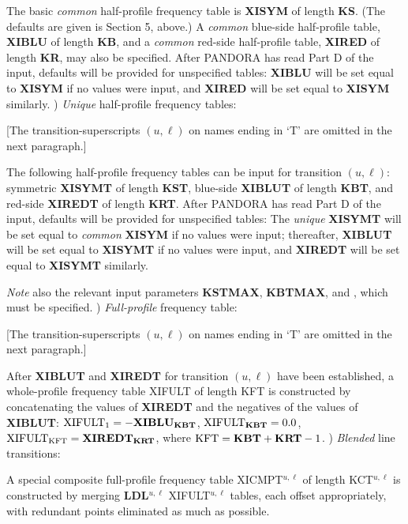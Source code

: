 The basic {\it common} half-profile frequency table is {\bf XISYM} of length {\bf KS}.
(The defaults are given is Section 5, above.)
A {\it common} blue-side half-profile table, {\bf XIBLU} of length {\bf KB},
and a {\it common} red-side half-profile table, {\bf XIRED} of length {\bf KR},
may also be specified. After PANDORA has read Part D of the input,
defaults will be provided for unspecified tables: {\bf XIBLU} will be set
equal to {\bf XISYM} if no values were input, and {\bf XIRED} will be set
equal to {\bf XISYM} similarly.
\blankline
{}) {\it Unique} half-profile frequency tables:

[The transition-superscripts $(u,\ell)$ on names ending in `T'
are omitted in the next paragraph.]

The following half-profile frequency tables can be input for transition $(u,\ell)$:
symmetric {\bf XISYMT} of length {\bf KST},
blue-side {\bf XIBLUT} of length {\bf KBT}, and
red-side {\bf XIREDT} of length {\bf KRT}. After PANDORA has read Part D
of the input, defaults will be provided for unspecified tables:
The {\it unique} {\bf XISYMT} will be set equal to {\it common}
{\bf XISYM} if no values were input; thereafter, {\bf XIBLUT} will
be set equal to {\bf XISYMT} if no values were input, and {\bf XIREDT}
will be set equal to {\bf XISYMT} similarly.

{\it Note} also the relevant input parameters {\bf KSTMAX},
{\bf KBTMAX}, and , which must be specified.
\blankline
{}) {\it Full-profile} frequency table:

[The transition-superscripts $(u,\ell)$ on names ending in `T'
are omitted in the next paragraph.]

After {\bf XIBLUT} and {\bf XIREDT} for transition $(u,\ell)$ have been
established, a whole-profile frequency table XIFULT of length KFT
is constructed by concatenating the values of {\bf XIREDT} and the negatives
of the values of {\bf XIBLUT}:
${\rm XIFULT}_1 = - {\bf XIBLU}_{\bf KBT}$, ${\rm XIFULT}_{\bf KBT} = 0.0$,
${\rm XIFULT}_{\rm KFT} = {\bf XIREDT}_{\bf KRT}$,
where ${\rm KFT} = {\bf KBT} + {\bf KRT} - 1$.
\ej
{}) {\it Blended} line transitions:

A special composite full-profile frequency table XICMPT$^{u,\ell}$
of length KCT$^{u,\ell}$ is constructed by merging {\bf LDL}$^{u,\ell}$
XIFULT$^{u,\ell}$ tables, each offset appropriately, with redundant
points eliminated as much as possible.


